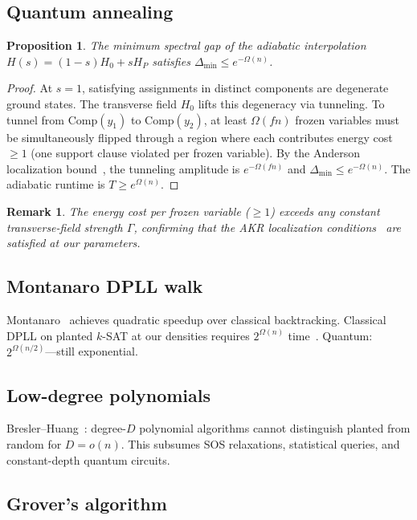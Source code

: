 \documentclass[11pt]{article}
\newtheorem{proposition}[theorem]{Proposition}
\newtheorem{remark}[theorem]{Remark}
\begin{document}
\subsection{Quantum annealing}

\begin{proposition}\label{prop:anneal}
The minimum spectral gap of the adiabatic interpolation $H(s) = (1-s)H_0 + sH_P$ satisfies $\Delta_{\min} \leq e^{-\Omega(n)}$.
\end{proposition}

\begin{proof}
At $s = 1$, satisfying assignments in distinct components are degenerate ground states.  The transverse field $H_0$ lifts this degeneracy via tunneling.  To tunnel from $\mathrm{Comp}(y_1)$ to $\mathrm{Comp}(y_2)$, at least $\Omega(fn)$ frozen variables must be simultaneously flipped through a region where each contributes energy cost $\geq 1$ (one support clause violated per frozen variable).  By the Anderson localization bound~\cite{AKR10}, the tunneling amplitude is $e^{-\Omega(fn)}$ and $\Delta_{\min} \leq e^{-\Omega(n)}$.  The adiabatic runtime is $T \geq e^{\Omega(n)}$.
\end{proof}

\begin{remark}
The energy cost per frozen variable ($\geq 1$) exceeds any constant transverse-field strength $\Gamma$, confirming that the AKR localization conditions~\cite{AKR10} are satisfied at our parameters.
\end{remark}


\subsection{Montanaro DPLL walk}
Montanaro~\cite{Mon18} achieves quadratic speedup over classical backtracking.  Classical DPLL on planted $k$-SAT at our densities requires $2^{\Omega(n)}$ time~\cite{ACO08}.  Quantum: $2^{\Omega(n/2)}$---still exponential.


\subsection{Low-degree polynomials}
Bresler--Huang~\cite{BH22}: degree-$D$ polynomial algorithms cannot distinguish planted from random for $D = o(n)$.  This subsumes SOS relaxations, statistical queries, and constant-depth quantum circuits.


\subsection{Grover's algorithm}\label{sec:grover}
\end{document}
